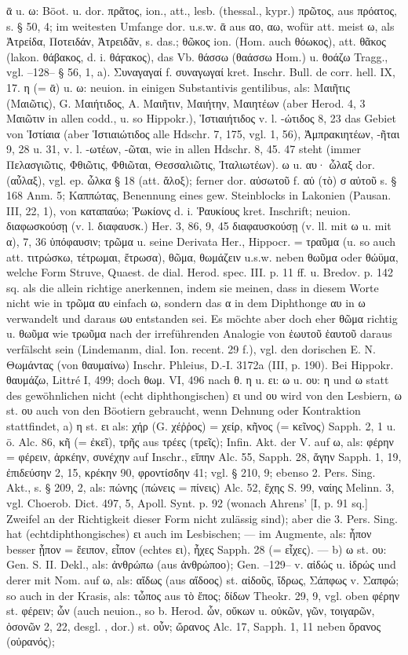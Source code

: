 ᾱ u. ω: Böot. u. dor. πρᾶτος, ion., att., lesb. (thessal., kypr.) πρῶτος, aus πρόατος, s. § 50, 4; im weitesten Umfange dor. u.s.w. ᾱ aus αο, αω, wofür att. meist ω, als Ἀτρείδα, Ποτειδάν, Ἀτρειδᾶν, s. das.; θῶκος ion. (Hom. auch θόωκος), att. θᾶκος (lakon. θάβακος, d. i. θάϝακος), das Vb. θάσσω (θαάσσω Hom.) u. θοάζω Tragg., vgl. --128-- § 56, 1, a). Συναγαγαί f. συναγωγαί kret. Inschr. Bull. de corr. hell. IX, 17. η (= ᾱ) u. ω: neuion. in einigen Substantivis gentilibus, als: Μαιῆτις (Μαιῶτις), G. Μαιήτιδος, A. Μαιῆτιν, Μαιήτην, Μαιητέων (aber Herod. 4, 3 Μαιῶτιν in allen codd., u. so Hippokr.), Ἱστιαιήτιδος v. l. -ώτιδος 8, 23 das Gebiet von Ἱστίαια (aber Ἱστιαιώτιδος alle Hdschr. 7, 175, vgl. 1, 56), Ἀμπρακιητέων, -ῆται 9, 28 u. 31, v. l. -ωτέων, -ῶται, wie in allen Hdschr. 8, 45. 47 steht (immer Πελασγιῶτις, Φθιῶτις, Φθιῶται, Θεσσαλιῶτις, Ἰταλιωτέων). ω u. αυ· ὦλαξ dor. (αὖλαξ), vgl. ep. ὦλκα § 18 (att. ἄλοξ); ferner dor. αὐσωτοῦ f. αὐ (τὸ) σ αὐτοῦ s. § 168 Anm. 5; Καππώτας, Benennung eines gew. Steinblocks in Lakonien (Pausan. III, 22, 1), von καταπαύω; Ῥωκίονς d. i. Ῥαυκίους kret. Inschrift; neuion. διαφωσκούσῃ (v. l. διαφαυσκ.) Her. 3, 86, 9, 45 διαφαυσκούσῃ (v. ll. mit ω u. mit α), 7, 36 ὑπόφαυσιν; τρῶμα u. seine Derivata Her., Hippocr. = τραῦμα (u. so auch att. τιτρώσκω, τέτρωμαι, ἔτρωσα), θῶμα, θωμάζειν u.s.w. neben θωῦμα oder θώϋμα, welche Form Struve, Quaest. de dial. Herod. spec. III. p. 11 ff. u. Bredov. p. 142 sq. als die allein richtige anerkennen, indem sie meinen, dass in diesem Worte nicht wie in τρῶμα αυ einfach ω, sondern das α in dem Diphthonge αυ in ω verwandelt und daraus ωυ entstanden sei. Es möchte aber doch eher θῶμα richtig u. θωῦμα wie τρωῦμα nach der irreführenden Analogie von ἑωυτοῦ ἑαυτοῦ daraus verfälscht sein (Lindemanm, dial. Ion. recent. 29 f.), vgl. den dorischen E. N. Θωμάντας (von θαυμαίνω) Inschr. Phleius, D.-I. 3172a (III, p. 190). Bei Hippokr. θαυμάζω, Littré I, 499; doch θωμ. VI, 496 nach θ. η u. ει: ω u. ου: η und ω statt des gewöhnlichen nicht (echt diphthongischen) ει und ου wird von den Lesbiern, ω st. ου auch von den Böotiern gebraucht, wenn Dehnung oder Kontraktion stattfindet, a) η st. ει als: χήρ (G. χέῤῥος) = χείρ, κῆνος (= κεῖνος) Sapph. 2, 1 u. ö. Alc. 86, κῆ (= ἐκεῖ), τρῆς aus τρέες (τρεῖς); Infin. Akt. der V. auf ω, als: φέρην = φέρειν, ἀρκέην, συνέχην auf Inschr., εἴπην Alc. 55, Sapph. 28, ἄγην Sapph. 1, 19, ἐπιδεύσην 2, 15, κρέκην 90, φροντίσδην 41; vgl. § 210, 9; ebenso 2. Pers. Sing. Akt., s. § 209, 2, als: πώνης (πώνεις = πίνεις) Alc. 52, ἔχης S. 99, ναίης Melinn. 3, vgl. Choerob. Dict. 497, 5, Apoll. Synt. p. 92 (wonach Ahrens' [I, p. 91 sq.] Zweifel an der Richtigkeit dieser Form nicht zulässig sind); aber die 3. Pers. Sing. hat (echtdiphthongisches) ει auch im Lesbischen; — im Augmente, als: ἦπον besser ᾖπον = ἔειπον, εἶπον (echtes ει), ἦχες Sapph. 28 (= εἶχες). — b) ω st. ου: Gen. S. II. Dekl., als: ἀνθρώπω (aus ἀνθρώποο); Gen. --129-- v. αἰδώς u. ἱδρώς und derer mit Nom. auf ω, als: αἴδως (aus αἴδοος) st. αἰδοῦς, ἴδρως, Σάπφως v. Σαπφώ; so auch in der Krasis, als: τὦπος aus τὸ ἔπος; δίδων Theokr. 29, 9, vgl. oben φέρην st. φέρειν; ὦν (auch neuion., so b. Herod. ὦν, οὔκων u. οὐκῶν, γῶν, τοιγαρῶν, ὁσονῶν 2, 22, desgl. , dor.) st. οὖν; ὤρανος Alc. 17, Sapph. 1, 11 neben ὄρανος (οὐρανός); 